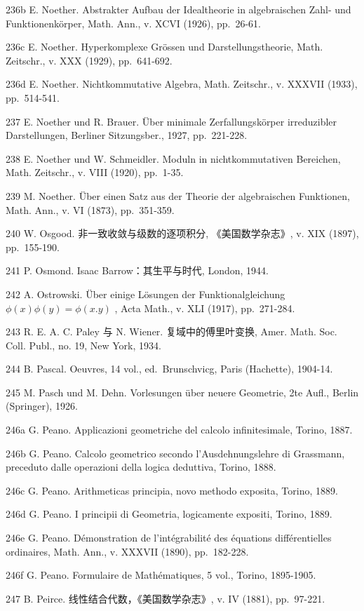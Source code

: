 236b E. Noether. Abstrakter Aufbau der Idealtheorie in algebraischen Zahl- und Funktionenkörper, Math. Ann., v. XCVI (1926), pp.~26-61.

236c E. Noether. Hyperkomplexe Grössen und Darstellungstheorie, Math. Zeitschr., v. XXX (1929), pp.~641-692.

236d E. Noether. Nichtkommutative Algebra, Math. Zeitschr., v. XXXVII (1933), pp.~514-541.

237 E. Noether und R. Brauer. Über minimale Zerfallungskörper irreduzibler Darstellungen, Berliner Sitzungsber., 1927, pp.~221-228.

238 E. Noether und W. Schmeidler. Moduln in nichtkommutativen Bereichen, Math. Zeitschr., v. VIII (1920), pp.~1-35.

239 M. Noether. Über einen Satz aus der Theorie der algebraischen Funktionen, Math. Ann., v. VI (1873), pp.~351-359.

240 W. Osgood. 非一致收敛与级数的逐项积分, 《美国数学杂志》, v. XIX (1897), pp.~155-190.

241 P. Osmond. Isaac Barrow：其生平与时代, London, 1944.

242 A. Ostrowski. Über einige Lösungen der Funktionalgleichung \(\phi(x)\phi(y) = \phi(x.y)\) , Acta Math., v. XLI (1917), pp.~271-284.

243 R. E. A. C. Paley 与 N. Wiener. 复域中的傅里叶变换, Amer. Math. Soc. Coll. Publ., no. 19, New York, 1934.

244 B. Pascal. Oeuvres, 14 vol., ed.~Brunschvicg, Paris (Hachette), 1904-14.

245 M. Pasch und M. Dehn. Vorlesungen über neuere Geometrie, 2te Aufl., Berlin (Springer), 1926.

246a G. Peano. Applicazioni geometriche del calcolo infinitesimale, Torino, 1887.

246b G. Peano. Calcolo geometrico secondo l'Ausdehnungslehre di Grassmann, preceduto dalle operazioni della logica deduttiva, Torino, 1888.

246c G. Peano. Arithmeticas principia, novo methodo exposita, Torino, 1889.

246d G. Peano. I principii di Geometria, logicamente expositi, Torino, 1889.

246e G. Peano. Démonstration de l'intégrabilité des équations différentielles ordinaires, Math. Ann., v. XXXVII (1890), pp.~182-228.

246f G. Peano. Formulaire de Mathématiques, 5 vol., Torino, 1895-1905.

247 B. Peirce. 线性结合代数，《美国数学杂志》, v. IV (1881), pp.~97-221.

